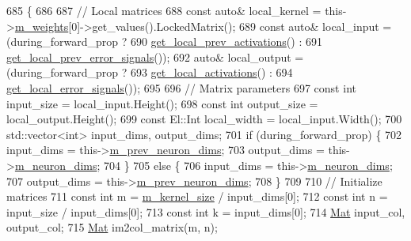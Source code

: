 \begin{DoxyCode}
685                                                                      \{
686 
687     \textcolor{comment}{// Local matrices}
688     \textcolor{keyword}{const} \textcolor{keyword}{auto}& local\_kernel = this->\hyperlink{classlbann_1_1Layer_a7954e30fbf9100a6ba4b56d02767a469}{m\_weights}[0]->get\_values().LockedMatrix();
689     \textcolor{keyword}{const} \textcolor{keyword}{auto}& local\_input = (during\_forward\_prop ?
690                                \hyperlink{classlbann_1_1Layer_a35397843bb0c84030000c7d872229acb}{get\_local\_prev\_activations}() :
691                                \hyperlink{classlbann_1_1Layer_a82827edc5e869960144f3ccb2172bfcd}{get\_local\_prev\_error\_signals}());
692     \textcolor{keyword}{auto}& local\_output = (during\_forward\_prop ?
693                           \hyperlink{classlbann_1_1Layer_a4248f27acebf72b7b7b3ee39c8bcb62a}{get\_local\_activations}() :
694                           \hyperlink{classlbann_1_1Layer_af178d00b9d878aa7d87754bff2a91f3a}{get\_local\_error\_signals}());
695 
696     \textcolor{comment}{// Matrix parameters}
697     \textcolor{keyword}{const} \textcolor{keywordtype}{int} input\_size = local\_input.Height();
698     \textcolor{keyword}{const} \textcolor{keywordtype}{int} output\_size = local\_output.Height();
699     \textcolor{keyword}{const} El::Int local\_width = local\_input.Width();
700     std::vector<int> input\_dims, output\_dims;
701     \textcolor{keywordflow}{if} (during\_forward\_prop) \{
702       input\_dims = this->\hyperlink{classlbann_1_1Layer_ae204d1a2a79606eaa117273857ff62a3}{m\_prev\_neuron\_dims};
703       output\_dims = this->\hyperlink{classlbann_1_1Layer_abb34bb8031f57a483e2e327a5f229f48}{m\_neuron\_dims};
704     \}
705     \textcolor{keywordflow}{else} \{
706       input\_dims = this->\hyperlink{classlbann_1_1Layer_abb34bb8031f57a483e2e327a5f229f48}{m\_neuron\_dims};
707       output\_dims = this->\hyperlink{classlbann_1_1Layer_ae204d1a2a79606eaa117273857ff62a3}{m\_prev\_neuron\_dims};
708     \}
709 
710     \textcolor{comment}{// Initialize matrices}
711     \textcolor{keyword}{const} \textcolor{keywordtype}{int} m = \hyperlink{classlbann_1_1base__convolution__layer_aa9da3e44499643a86bd611b5eb500dd4}{m\_kernel\_size} / input\_dims[0];
712     \textcolor{keyword}{const} \textcolor{keywordtype}{int} n = input\_size / input\_dims[0];
713     \textcolor{keyword}{const} \textcolor{keywordtype}{int} k = input\_dims[0];
714     \hyperlink{base_8hpp_a68f11fdc31b62516cb310831bbe54d73}{Mat} input\_col, output\_col;
715     \hyperlink{base_8hpp_a68f11fdc31b62516cb310831bbe54d73}{Mat} im2col\_matrix(m, n);

\end{DoxyCode}
